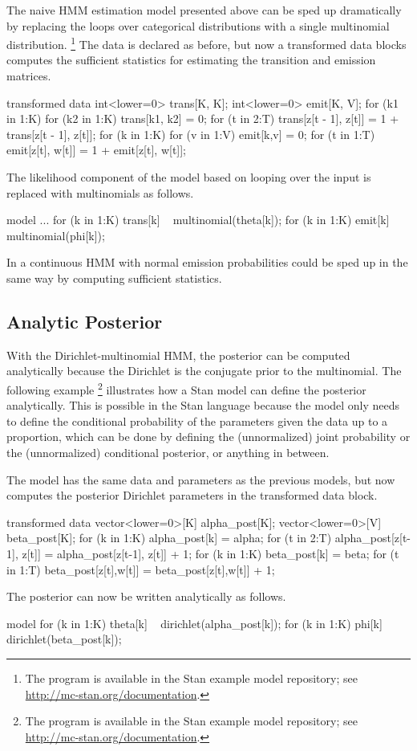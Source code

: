 The naive HMM estimation model presented above can be sped up
dramatically by replacing the loops over categorical distributions
with a single multinomial distribution.%
%
\footnote{The program is available in the Stan example model repository;
see \url{http://mc-stan.org/documentation}.}
%
The data is declared as before, but now a transformed data blocks
computes the sufficient statistics for estimating the transition and
emission matrices.
%
\begin{stancode}
transformed data {
  int<lower=0> trans[K, K];
  int<lower=0> emit[K, V];
  for (k1 in 1:K) 
    for (k2 in 1:K)
      trans[k1, k2] = 0;
  for (t in 2:T)
    trans[z[t - 1], z[t]] = 1 + trans[z[t - 1], z[t]];
  for (k in 1:K)
    for (v in 1:V)
      emit[k,v] = 0;
  for (t in 1:T)
    emit[z[t], w[t]] = 1 + emit[z[t], w[t]];
}
\end{stancode}
%
The likelihood component of the model based on looping over the input
is replaced with multinomials as follows.
%
\begin{stancode}
model {
  ...
  for (k in 1:K)
    trans[k] ~ multinomial(theta[k]);
  for (k in 1:K)
    emit[k] ~ multinomial(phi[k]);
}
\end{stancode}
%
In a continuous HMM with normal emission probabilities could be sped
up in the same way by computing sufficient statistics.

\subsection{Analytic Posterior}

With the Dirichlet-multinomial HMM, the posterior can be computed
analytically because the Dirichlet is the conjugate prior to the
multinomial.  The following example%
%
\footnote{The program is available in the Stan example model repository;
see \url{http://mc-stan.org/documentation}.}
%
illustrates how a Stan model can define the posterior analytically.
This is possible in the Stan language because the model only needs to
define the conditional probability of the parameters given the data up
to a proportion, which can be done by defining the (unnormalized)
joint probability or the (unnormalized) conditional posterior, or
anything in between.

The model has the same data and parameters as the previous models, but
now computes the posterior Dirichlet parameters in the transformed
data block.
%
\begin{stancode}
transformed data {
  vector<lower=0>[K] alpha_post[K];
  vector<lower=0>[V] beta_post[K];
  for (k in 1:K) 
    alpha_post[k] = alpha;
  for (t in 2:T)
    alpha_post[z[t-1], z[t]] = alpha_post[z[t-1], z[t]] + 1;
  for (k in 1:K)
    beta_post[k] = beta;
  for (t in 1:T)
    beta_post[z[t],w[t]] = beta_post[z[t],w[t]] + 1;
}
\end{stancode}
%
The posterior can now be written analytically as follows.
%
\begin{stancode}
model {
  for (k in 1:K) 
    theta[k] ~ dirichlet(alpha_post[k]);
  for (k in 1:K)
    phi[k] ~ dirichlet(beta_post[k]);
}
\end{stancode}


